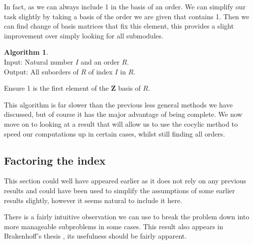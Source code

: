 \documentclass[12pt,a4paper,abstracton,bibtotoc]{scrreprt}
\theoremstyle{definition}
\newtheorem{alg}{Algorithm}
\newcommand{\ZZ}{\mathbf{Z}}
\begin{document}
In fact, as we can always include 1 in the basis of an order.
We can simplify our task slightly by taking a basis of the order we are given that contains 1.
Then we can find change of basis matrices that fix this element, this provides a slight improvement over simply looking for all submodules.

\begin{alg}~\\
Input: Natural number $I$ and an order $R$.\\
Output: All suborders of $R$ of index $I$ in $R$.\\
\begin{algorithm}[H]
Ensure 1 is the first element of the $\ZZ$ basis of $R$.\\
\end{algorithm}
\end{alg}

This algorithm is far slower than the previous less general methods we have discussed, but of course it has the major advantage of being complete.
We now move on to looking at a result that will allow us to use the cocylic method to speed our computations up in certain cases, whilst still finding all orders.

\subsection{Factoring the index}
This section could well have appeared earlier as it does not rely on any previous results and could have been used to simplify the assumptions of some earlier results slightly, however it seems natural to include it here.

There is a fairly intuitive observation we can use to break the problem down into more manageable subproblems in some cases.
This result also appears in Brakenhoff's thesis \cite[pp. 49--50]{brakenhoff}, its usefulness should be fairly apparent.
\end{document}
